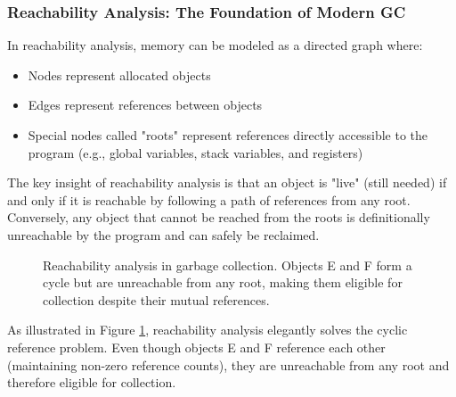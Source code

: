 \documentclass{article}
\begin{document}
\subsubsection{Reachability Analysis: The Foundation of Modern GC}

In reachability analysis, memory can be modeled as a directed graph where:
\begin{itemize}
    \item Nodes represent allocated objects
    \item Edges represent references between objects
    \item Special nodes called "roots" represent references directly accessible to the program (e.g., global variables, stack variables, and registers)
\end{itemize}

The key insight of reachability analysis is that an object is "live" (still needed) if and only if it is reachable by following a path of references from any root. Conversely, any object that cannot be reached from the roots is definitionally unreachable by the program and can safely be reclaimed.

\begin{figure}[h]
\centering
{}
\caption{Reachability analysis in garbage collection. Objects E and F form a cycle but are unreachable from any root, making them eligible for collection despite their mutual references.}
\label{fig:reachability}
\end{figure}

As illustrated in Figure \ref{fig:reachability}, reachability analysis elegantly solves the cyclic reference problem. Even though objects E and F reference each other (maintaining non-zero reference counts), they are unreachable from any root and therefore eligible for collection.
\end{document}
